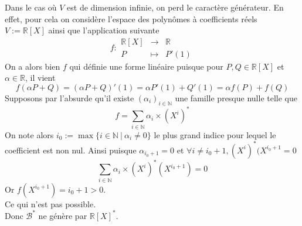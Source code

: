 \documentclass[../geometrie.tex]{subfiles}
\begin{document}
{		

		Dans le cas où $V$ est de dimension infinie, on perd le caractère générateur. En effet, pour cela on considère l'espace des polynômes à coefficients réels $V := \mathbb{R}[X]$ ainsi que l'application suivante
		$$
			f :
			\begin{array}{rcl}
				\mathbb{R}[X] & \longrightarrow & \mathbb{R} \\
				P & \longmapsto & P'(1)
			\end{array}
		$$
		On a alors bien $f$ qui définie une forme linéaire puisque pour $P, Q \in \mathbb{R}[X]$ et $\alpha \in \mathbb{R}$, il vient
		$$
			f(\alpha P + Q) = (\alpha P + Q)'(1) = \alpha P'(1) + Q'(1) = \alpha f(P) + f(Q)
		$$
		Supposons par l'absurde qu'il existe $(\alpha_{i})_{i \in \mathbb{N}}$ une famille presque nulle telle que
		$$
			f = \sum_{i \in \mathbb{N}} \alpha_{i} \times (X^{i})^{*}
		$$
		On note alors $i_{0} := \max \{ i \in \mathbb{N} \ | \ \alpha_{i} \neq 0 \}$ le plus grand indice pour lequel le coefficient est non nul. Ainsi puisque $\alpha_{i_{0} + 1} = 0$ et $\forall i \neq i_{0} + 1, (X^{i})^{*}(X^{i_{0} + 1} = 0$
		$$
			\sum_{i \in \mathbb{N}} \alpha_{i} \times (X^{i})^{*}(X^{i_{0} + 1}) = 0
		$$
		Or $f(X^{i_{0} + 1}) = i_{0} + 1 > 0$. \\
		Ce qui n'est pas possible. \\
		Donc $\mathcal{B}^{*}$ ne génère par $\mathbb{R}[X]^{*}$.

}
\end{document}
